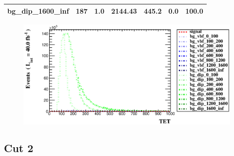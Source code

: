 \documentclass[a4paper, 10pt]{article}
\begin{document}
\begin{table}[H]
\begin{center}
\begin{tabular}{|m{23.0mm}|m{23.0mm}|m{18.0mm}|m{19.0mm}|m{19.0mm}|m{19.0mm}|m{19.0mm}|}
      \hline
      {\cellcolor{white}         bg\_dip\_1600\_inf}& {\cellcolor{white}         187}& {\cellcolor{white}         1.0}& {\cellcolor{white}         2144.43}& {\cellcolor{white}         445.2}& {\cellcolor{red}         0.0}& {\cellcolor{red}         100.0}\\
\hline
    \end{tabular}
  \end{center}
\end{table}

\begin{figure}[H]
  \begin{center}
    \includegraphics[scale=0.45]{selection_15.eps}\\
\caption{   }
  \end{center}
\end{figure}
      \newpage
\subsection{Cut 2}
\end{document}
